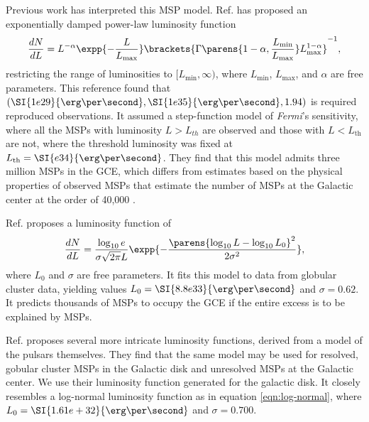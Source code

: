 \documentclass{C://Aliases//Dropbox-MIT//Latex_Templates//personal}
\begin{document}
Previous work has interpreted this MSP model. Ref. \cite{Zhong:2019ycb} has proposed an exponentially damped power-law luminosity function
\begin{equation}
    \frac{dN}{dL} = L^{-\alpha} \expp{-\frac{L}{L_\text{max}}}\brackets{\Gamma\parens{1-\alpha, \frac{L_\text{min}}{L_\text{max}}}L_\text{max}^{1-\alpha}}^{-1},
    \label{eqn:power-law}
\end{equation}
restricting the range of luminosities to $[L_\text{min}, \infty)$, where $L_\text{min}$, $L_\text{max}$, and $\alpha$ are free parameters. This reference found that $(\SI{1e29}{\erg\per\second}, \SI{1e35}{\erg\per\second}, 1.94)$ is required reproduced observations. It assumed a step-function model of \textit{Fermi}'s sensitivity, where all the MSPs with luminosity $L>L_{th}$ are observed and those with $L<L_\text{th}$ are not, where the threshold luminosity was fixed at $L_\text{th}=\SI{e34}{\erg\per\second}$. They find that this model admits three million MSPs in the GCE, which differs from estimates based on the physical properties of observed MSPs that estimate the number of MSPs at the Galactic center at the order of 40,000 \cite{citation needed}.

Ref. \cite{osti_1305131} proposes a luminosity function of 
\begin{equation}
    \frac{dN}{dL} = \frac{\log_{10} e}{\sigma \sqrt{2\pi} L}\expp{-\frac{\parens{\log_{10} L - \log_{10} L_0}^2}{2\sigma^2}},
    \label{eqn:log-normal}
\end{equation}
where $L_0$ and $\sigma$ are free parameters. It fits this model to data from globular cluster data, yielding values $L_0 = \SI{8.8e33}{\erg\per\second}$ and $\sigma=0.62$. It predicts thousands of MSPs to occupy the GCE if the entire excess is to be explained by MSPs.

Ref. \cite{Ploeg:2020jeh} proposes several more intricate luminosity functions, derived from a model of the pulsars themselves. They find that the same model may be used for resolved, gobular cluster MSPs in the Galactic disk and unresolved MSPs at the Galactic center. We use their luminosity function generated for the galactic disk. It closely resembles a log-normal luminosity function as in equation \ref{eqn:log-normal}, where $L_0 = \SI{1.61e+32}{\erg\per\second}$ and $\sigma=0.700$. 
\end{document}
